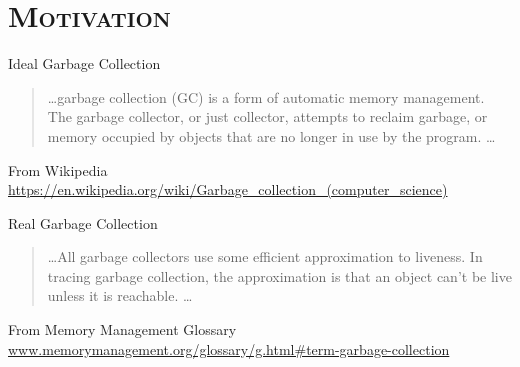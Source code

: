 \newcommand{\OneCell}[1]{%
\psset{unit=.25mm}
\begin{pspicture}(0,-2)(36,18)
\psframe(0,-5)(36,15)
\putnode{zarb1342}{origin}{18}{5}{\rnode{#1}{}}
\end{pspicture}%
}

\newcommand{\TwoCells}[2]{%
\psset{unit=.25mm}
\begin{pspicture}(0,-2)(36,18)
\psframe(0,-5)(36,15)
\psline(18,-4)(18,15)
\putnode{zarb1342}{origin}{9}{5}{\rnode{#1}{}}
\putnode{zarb0102}{origin}{27}{5}{\rnode{#2}{}}
\end{pspicture}%
}

\newcommand{\nilfigure}
{\scalebox{0.75}{
\psset{unit=1mm,nodesep=0mm,labelsep=0.5mm}
\begin{pspicture}(0,0)(1,1)
\putnode{start}{origin}{0}{0}{}
\putnode{stop}{origin}{10}{10}{}
\ncline[offsetB=0,nodesepB=0,linewidth=.7]{-}{start}{stop} %
\end{pspicture}
}}



\frame{\titlepage}
\section{\scshape Motivation}

\begin{frame}{Ideal Garbage Collection}
  \begin{quote}
    \ldots garbage collection (GC) is a form of automatic memory management.  The  garbage  collector,  or  just collector,  attempts  to  reclaim
  garbage, or memory occupied by objects  that are {\red no longer in use} by
  the program. \ldots
  \end{quote}
  From Wikipedia\\ {\scriptsize \url{https://en.wikipedia.org/wiki/Garbage_collection_(computer_science)}}
\end{frame}

\begin{frame}{Real Garbage Collection}
  \begin{quote}
    \ldots All garbage collectors use some efficient {\red approximation to
    liveness}. In {tracing} garbage collection, the approximation is that
    an object can't be live unless it is {\red reachable}.
    \ldots
  \end{quote}
  From Memory Management Glossary\\
  {\scriptsize \url{www.memorymanagement.org/glossary/g.html\#term-garbage-collection}}
\end{frame}

